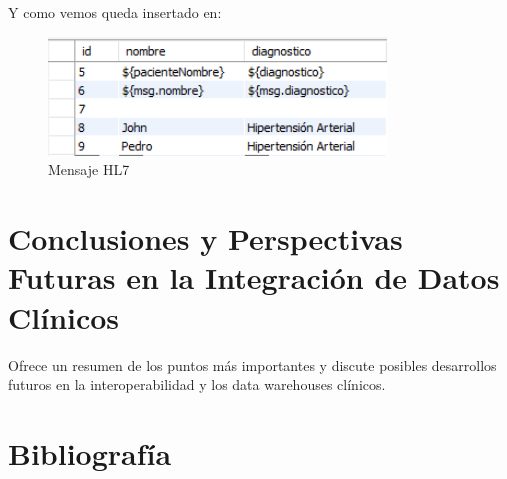 \documentclass[12pt, a4paper, twoside]{article}
\begin{document}
	Y como vemos queda insertado en: 
	
	\begin{figure}[h!]
		\centering
		\includegraphics[width=0.8\textwidth]{image/10.png}
		\caption{Mensaje HL7}
		\label{fig:10}
	\end{figure}
	
	\section{Conclusiones y Perspectivas Futuras en la Integración de Datos Clínicos}
	Ofrece un resumen de los puntos más importantes y discute posibles desarrollos futuros en la interoperabilidad y los data warehouses clínicos.
	
	\section{Bibliografía}
	\printbibliography
	
	
	
\end{document}
